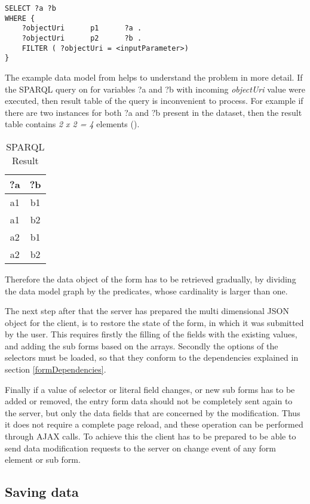 
\begin{lstlisting}[captionpos=b, caption=SPARQL query for the form data, label={sparqlExisting},
basicstyle=\footnotesize,frame=single]
SELECT ?a ?b
WHERE {
	?objectUri		p1		?a .
	?objectUri		p2		?b .
	FILTER ( ?objectUri = <inputParameter>)
}
\end{lstlisting}

The example data model from  helps to understand the problem in more detail. If the SPARQL query on  for variables ?a and ?b with incoming \textit{objectUri} value were executed, then result table of the query is inconvenient to process. For example if there are two instances for both ?a and ?b present in the dataset, then the result table contains \textit{2 x 2 = 4} elements ().

\begin{table}

	\begin{center}
		\begin{tabular}{||c | c||} 
			\hline
			?a & ?b  \\ [0.5ex] 
			\hline\hline
			a1 & b1 \\ 
			\hline
			a1 & b2 \\
			\hline
			a2 & b1 \\
			\hline
			a2 & b2 \\ [1ex] 
			\hline 
		\end{tabular}
	\end{center}
	\caption{SPARQL Result}  \label{sparqlResult}
\end{table}


Therefore the data object of the form has to be retrieved gradually, by dividing the data model graph by the predicates, whose cardinality is larger than one.

The next step after that the server has prepared the multi dimensional JSON object for the client, is to restore the state of the form, in which it was submitted by the user. This requires firstly the filling of the fields with the existing values, and adding the sub forms based on the arrays. Secondly the options of the selectors must be loaded, so that they conform to the dependencies explained in section \ref{formDependencies}. 

Finally if a value of selector or literal field changes, or new sub forms has to be added or removed, the entry form data should not be completely sent again to the server, but only the data fields that are concerned by the modification. Thus it does not require a complete page reload, and these operation can be performed through AJAX calls. To achieve this the client has to be prepared to be able to send data modification requests to the server on change event of any form element or sub form.

\subsection{Saving data}













